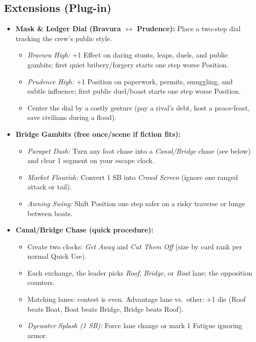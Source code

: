 \subsection*{Extensions (Plug-in)}
\label{sec:silkstrand-extensions}
\begin{itemize}
  \item \textbf{Mask \& Ledger Dial (Bravura \(\leftrightarrow\) Prudence):} Place a two-step dial tracking the crew’s public style.
  \begin{itemize}
    \item \emph{Bravura High:} +1 Effect on daring stunts, leaps, duels, and public gambits; first quiet bribery/forgery starts one step worse Position.
    \item \emph{Prudence High:} +1 Position on paperwork, permits, smuggling, and subtle influence; first public duel/boast starts one step worse Position.
    \item Center the dial by a costly gesture (pay a rival’s debt, host a peace-feast, save civilians during a flood).
  \end{itemize}

  \item \textbf{Bridge Gambits (free once/scene if fiction fits):}
  \begin{itemize}
    \item \emph{Parapet Dash:} Turn any foot chase into a \emph{Canal/Bridge} chase (see below) and clear 1 segment on your escape clock.
    \item \emph{Market Flourish:} Convert 1 SB into \emph{Crowd Screen} (ignore one ranged attack or tail).
    \item \emph{Awning Swing:} Shift Position one step safer on a risky traverse or lunge between boats.
  \end{itemize}

  \item \textbf{Canal/Bridge Chase (quick procedure):}
  \begin{itemize}
    \item Create two clocks: \emph{Get Away} and \emph{Cut Them Off} (size by card rank per normal Quick Use).
    \item Each exchange, the leader picks \emph{Roof}, \emph{Bridge}, or \emph{Boat} lane; the opposition counters.
    \item Matching lanes: contest is even. Advantage lane vs.\ other: +1 die (Roof beats Boat, Boat beats Bridge, Bridge beats Roof).
    \item \emph{Dyewater Splash (1 SB):} Force lane change or mark 1 Fatigue ignoring armor.
  \end{itemize}


\end{itemize}
